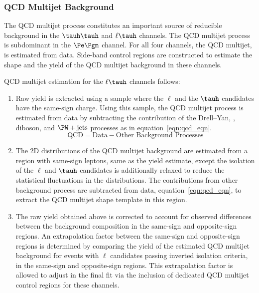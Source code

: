 \subsubsection{QCD Multijet Background}
The QCD multijet process constitutes an important source of reducible background 
in the $\tauh\tauh$ and $\ell\tauh$ channels. The QCD multijet process is subdominant
in the $\Pe\Pgm$ channel. For all four channels, the QCD multijet, is estimated from data.  
Side-band control regions are constructed to estimate the shape and the yield of the QCD multijet 
background in these channels.

QCD multijet estimation for the $\ell\tauh$ channels follows:
\begin{enumerate}

\item Raw yield is extracted using a sample where the
$\ell$ and the $\tauh$ candidates have the same-sign charge. Using this sample, the QCD multijet 
process is estimated from data by subtracting the contribution of the Drell--Yan, \ttbar, diboson,
and $\PW+\text{jets}$ processes as in equation~\ref{eqn:qcd_eqn}.
\begin{equation}
\label{eqn:qcd_eqn}
\text{QCD} = \text{Data} - \text{Other Background Processes}
\end{equation}

\item The 2D distributions of the QCD multijet background are estimated from a region with 
same-sign leptons, same as the yield estimate, except the isolation of the $\ell$ and $\tauh$ 
candidates is additionally relaxed to reduce the statistical fluctuations in the distributions. 
The contributions from other background process are subtracted from data, equation~\ref{eqn:qcd_eqn},
to extract the QCD multijet shape template in this region.

\item The raw yield obtained above is corrected to account for observed differences between the background 
composition in the same-sign and opposite-sign regions. An extrapolation factor between the same-sign 
and opposite-sign regions is determined by comparing the yield of the estimated QCD multijet background for 
events with $\ell$ candidates passing inverted isolation criteria, in the same-sign and opposite-sign 
regions. This extrapolation factor is allowed to adjust in the final fit via the inclusion of dedicated QCD
multijet control regions for these channels.
\end{enumerate}

